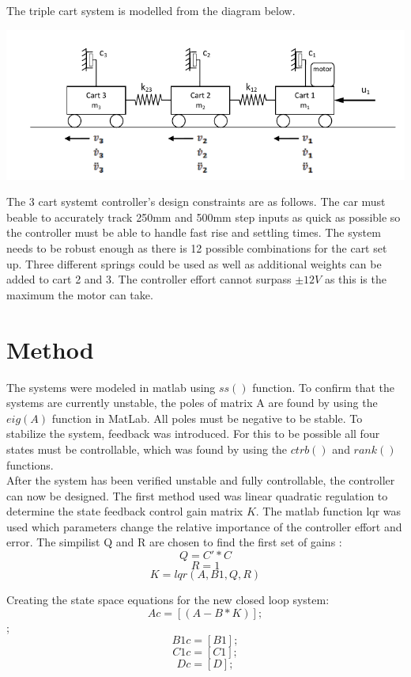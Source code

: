 \documentclass[a4paper,12pt]{article}
\begin{document}
\noindent
The triple cart system is modelled from the diagram below.
\begin{center}
\includegraphics[scale=0.3]{3cart_diagram.png}\\
\end{center}
The 3 cart systemt controller's design constraints are as follows. The car must beable to accurately track 250mm and 500mm step inputs as quick as possible so the controller must be able to handle fast rise and settling times. The system needs to be robust enough as there is 12 possible combinations for the cart set up. Three different springs could be used as well as additional weights can be added to cart 2 and 3. The controller effort cannot surpass $\pm12V$ as this is the maximum the motor can take.

\section{Method}

\indent
The systems were modeled in matlab using $ss()$ function. To confirm that the systems are currently unstable, the poles of matrix A are found by using the $eig(A)$ function in MatLab. All poles must be negative to be stable. To stabilize the system, feedback was introduced. For this to be possible all four states must be controllable, which was found by using the $ctrb()$ and $rank()$ functions.\\

After the system has been verified unstable and fully controllable, the controller can now be designed. The first method used was linear quadratic regulation to determine the state feedback control gain matrix $K$. The matlab function lqr was used which parameters change the relative importance of the controller effort and error. The simpilist Q and R are chosen to find the first set of gains : $$Q = C'*C$$ $$R = 1$$ $$K = lqr(A,B1,Q,R)$$

Creating the state space equations for the new closed loop system:
$$Ac = [(A-B*K)];$$;
$$B1c = [B1];$$
$$C1c = [C1];$$
$$Dc = [D];$$
\end{document}
